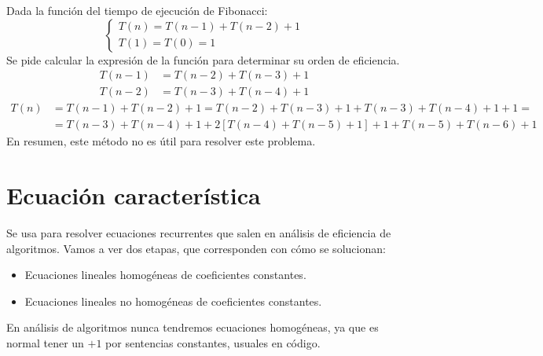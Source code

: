 \begin{ejemplo}[Fibonacci]\label{ej_fibonacci}
Dada la función del tiempo de ejecución de Fibonacci:
\begin{equation*}
    \left\{\begin{array}{l}
        T(n) = T(n-1)+T(n-2)+1 \\
        T(1) = T(0) = 1
    \end{array}\right.
\end{equation*}
Se pide calcular la expresión de la función para determinar su orden de eficiencia.
\begin{align*}
    T(n-1) &= T(n-2) + T(n-3) + 1\\
    T(n-2) &= T(n-3) +T(n-4)+1
\end{align*}
\begin{align*}
T(n) &= T(n-1)+T(n-2)+1 = T(n-2)+T(n-3)+1+T(n-3)+T(n-4)+1+1=\\
     &= T(n-3)+T(n-4)+1+2[T(n-4)+T(n-5)+1] + 1+T(n-5)+T(n-6)+1
\end{align*}
En resumen, este método no es útil para resolver este problema.
\end{ejemplo}

\section{Ecuación característica}
Se usa para resolver ecuaciones recurrentes que salen en análisis de eficiencia de algoritmos.
Vamos a ver dos etapas, que corresponden con cómo se solucionan:
\begin{itemize}
\item Ecuaciones lineales homogéneas de coeficientes constantes.
\item Ecuaciones lineales no homogéneas de coeficientes constantes.
\end{itemize}
  
En análisis de algoritmos nunca tendremos ecuaciones homogéneas, ya que es normal tener un $+1$ por sentencias constantes, usuales en código.
